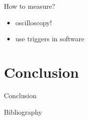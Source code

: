 \documentclass[presentation, bigger]{beamer}
\begin{document}
\begin{frame}[label=sec-3-2]{How to measure?}
\begin{itemize}
\item oscilloscopy!
\item use triggers in software
\end{itemize}
\end{frame}
\section{Conclusion}
\label{sec-4}
\begin{frame}[label=sec-4-1]{Conclusion}
\end{frame}
\begin{frame}[label=sec-4-2]{Bibliography}
\nocite{*}
\printbibliography
\end{frame}
\end{document}
